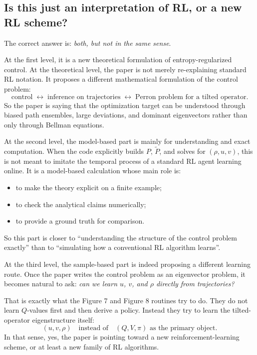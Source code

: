 \documentclass[11pt]{article}
\begin{document}
\subsection*{Is this just an interpretation of RL, or a new RL scheme?}

The correct answer is: \emph{both, but not in the same sense}.

At the first level, it is a new theoretical formulation of entropy-regularized control.
At the theoretical level, the paper is not merely re-explaining standard RL notation. It
proposes a different mathematical formulation of the control problem:
\begin{equation}
    \text{control}
    \;\longleftrightarrow\;
    \text{inference on trajectories}
    \;\longleftrightarrow\;
    \text{Perron problem for a tilted operator}.
\end{equation}
So the paper is saying that the optimization target can be understood through biased path
ensembles, large deviations, and dominant eigenvectors rather than only through Bellman
equations.

At the second level, the model-based part is mainly for understanding and exact computation.
When the code explicitly builds \(P\), \(\widetilde{P}\), and solves for \((\rho,u,v)\), this
is not meant to imitate the temporal process of a standard RL agent learning online. It is a
model-based calculation whose main role is:
\begin{itemize}
    \item to make the theory explicit on a finite example;
    \item to check the analytical claims numerically;
    \item to provide a ground truth for comparison.
\end{itemize}
So this part is closer to ``understanding the structure of the control problem exactly'' than
to ``simulating how a conventional RL algorithm learns''.

At the third level, the sample-based part is indeed proposing a different learning route.
Once the paper writes the control problem as an eigenvector problem, it becomes natural to ask:
\emph{can we learn \(u\), \(v\), and \(\rho\) directly from trajectories?}

That is exactly what the Figure 7 and Figure 8 routines try to do. They do not learn
\(Q\)-values first and then derive a policy. Instead they try to learn the tilted-operator
eigenstructure itself:
\begin{equation}
    (u,v,\rho)
    \quad \text{instead of} \quad
    (Q,V,\pi)
    \text{ as the primary object.}
\end{equation}
In that sense, yes, the paper is pointing toward a new reinforcement-learning scheme, or at
least a new family of RL algorithms.
\end{document}
